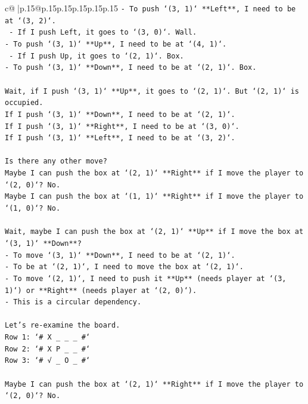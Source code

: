\documentclass{article}
\begin{document}
{\begin{supertabular}{c@{$\;$}|p{.15\linewidth}@{}p{.15\linewidth}p{.15\linewidth}p{.15\linewidth}p{.15\linewidth}p{.15\linewidth}}
{{{\texttt{{-} To push `(3, 1)` **Left**, I need to be at `(3, 2)`.} \\
\texttt{  {-} If I push Left, it goes to `(3, 0)`. Wall.} \\
\texttt{{-} To push `(3, 1)` **Up**, I need to be at `(4, 1)`.} \\
\texttt{  {-} If I push Up, it goes to `(2, 1)`. Box.} \\
\texttt{{-} To push `(3, 1)` **Down**, I need to be at `(2, 1)`. Box.} \\
\\ 
\texttt{Wait, if I push `(3, 1)` **Up**, it goes to `(2, 1)`. But `(2, 1)` is occupied.} \\
\texttt{If I push `(3, 1)` **Down**, I need to be at `(2, 1)`.} \\
\texttt{If I push `(3, 1)` **Right**, I need to be at `(3, 0)`.} \\
\texttt{If I push `(3, 1)` **Left**, I need to be at `(3, 2)`.} \\
\\ 
\texttt{Is there any other move?} \\
\texttt{Maybe I can push the box at `(2, 1)` **Right** if I move the player to `(2, 0)`? No.} \\
\texttt{Maybe I can push the box at `(1, 1)` **Right** if I move the player to `(1, 0)`? No.} \\
\\ 
\texttt{Wait, maybe I can push the box at `(2, 1)` **Up** if I move the box at `(3, 1)` **Down**?} \\
\texttt{{-} To move `(3, 1)` **Down**, I need to be at `(2, 1)`.} \\
\texttt{{-} To be at `(2, 1)`, I need to move the box at `(2, 1)`.} \\
\texttt{{-} To move `(2, 1)`, I need to push it **Up** (needs player at `(3, 1)`) or **Right** (needs player at `(2, 0)`).} \\
\texttt{{-} This is a circular dependency.} \\
\\ 
\texttt{Let's re{-}examine the board.} \\
\texttt{Row 1: `\# X \_ \_ \_ \#`} \\
\texttt{Row 2: `\# X P \_ \_ \#`} \\
\texttt{Row 3: `\# √ \_ O \_ \#`} \\
\\ 
\texttt{Maybe I can push the box at `(2, 1)` **Right** if I move the player to `(2, 0)`? No.} \\
}}}
\end{supertabular}}
\end{document}
